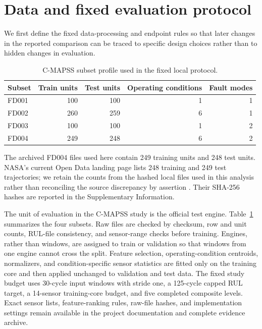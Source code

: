 \documentclass[preprint,12pt,numbers,sort&compress]{elsarticle}
\begin{document}
\section{Data and fixed evaluation protocol}

We first define the fixed data-processing and endpoint rules so that later changes in the reported comparison can be traced to specific design choices rather than to hidden changes in evaluation.

\begin{table}[!t]
\centering
\small
\caption{C-MAPSS subset profile used in the fixed local protocol.}
\label{tab:dataset}
\begin{tabular}{@{}lrrrr@{}}
\toprule
Subset & Train units & Test units & Operating conditions & Fault modes \\
\midrule
FD001 & 100 & 100 & 1 & 1 \\
FD002 & 260 & 259 & 6 & 1 \\
FD003 & 100 & 100 & 1 & 2 \\
FD004 & 249 & 248 & 6 & 2 \\
\bottomrule
\end{tabular}
\end{table}

The archived FD004 files used here contain 249 training units and 248 test units. NASA's current Open Data landing page lists 248 training and 249 test trajectories; we retain the counts from the hashed local files used in this analysis rather than reconciling the source discrepancy by assertion \citep{NASA_CMAPSS_OpenData}. Their SHA-256 hashes are reported in the Supplementary Information.

The unit of evaluation in the C-MAPSS study is the official test engine. Table~\ref{tab:dataset} summarizes the four subsets. Raw files are checked by checksum, row and unit counts, RUL-file consistency, and sensor-range checks before training. Engines, rather than windows, are assigned to train or validation so that windows from one engine cannot cross the split. Feature selection, operating-condition centroids, normalizers, and condition-specific sensor statistics are fitted only on the training core and then applied unchanged to validation and test data. The fixed study budget uses 30-cycle input windows with stride one, a 125-cycle capped RUL target, a 14-sensor training-core budget, and five completed composite levels. Exact sensor lists, feature-ranking rules, raw-file hashes, and implementation settings remain available in the project documentation and complete evidence archive.
\end{document}
